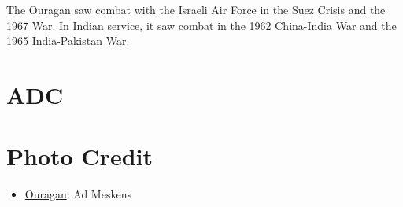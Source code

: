 The Ouragan saw combat with the Israeli Air Force in the Suez Crisis and the 1967 War. In Indian service, it saw combat in the 1962 China-India War and the 1965 India-Pakistan War.

\section{ADC}
\begin{adclist}
\end{adclist}

\section{Photo Credit}
\begin{itemize}\raggedright
    \item \href{https://commons.wikimedia.org/wiki/File:RMM_Brussel_Dassault_MD450_Ouragan_3.JPG}{Ouragan}: Ad Meskens
\end{itemize}